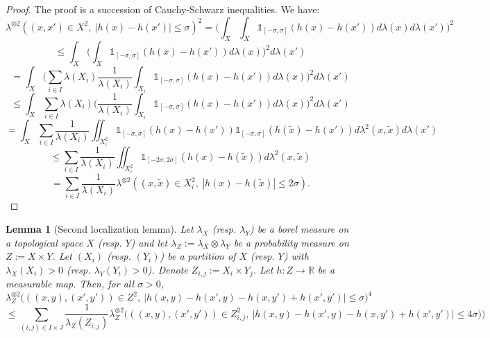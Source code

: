 \documentclass[a4paper]{article}
\newtheorem{lemma}[theorem]{Lemma}
\theoremstyle{definition}
\begin{document}
\begin{proof} The proof is a succession of Cauchy-Schwarz inequalities. We have:
$$\lambda^{\otimes 2}( (x,x') \in X^2, \ |h(x)-h(x')| \leq \sigma)^2 = \Big(\int_X \int_X \mathbb{1}_{[-\sigma,\sigma]}(h(x)-h(x')) d\lambda(x) d\lambda(x')\Big)^2 $$
$$ \leq \int_X \Big(\int_X \mathbb{1}_{[-\sigma,\sigma]}(h(x)-h(x')) d\lambda(x) \Big)^2 d\lambda(x') $$
$$ = \int_X \Big( \sum_{i \in I} \lambda(X_i) \frac{1}{\lambda(X_i)} \int_{X_i} \mathbb{1}_{[-\sigma,\sigma]}(h(x)-h(x')) d\lambda(x) \Big)^2 d\lambda(x')  $$
$$ \leq \int_X \sum_{i \in I} \lambda(X_i) \Big( \frac{1}{\lambda(X_i)} \int_{X_i} \mathbb{1}_{[-\sigma,\sigma]}(h(x)-h(x')) d\lambda(x) \Big)^2 d\lambda(x')  $$
$$ = \int_X \sum_{i \in I} \frac{1}{\lambda(X_i)} \iint_{X_i^2} \mathbb{1}_{[-\sigma,\sigma]}(h(x)-h(x')) \mathbb{1}_{[-\sigma,\sigma]}(h(\tilde{x})-h(x')) d\lambda^2(x,\tilde{x})  d\lambda(x') $$
$$ \leq  \sum_{i \in I} \frac{1}{\lambda(X_i)} \iint_{X_i^2} \mathbb{1}_{[-2 \sigma, 2 \sigma]}(h(x)-h(\tilde{x})) d\lambda^2(x,\tilde{x})  $$
$$ = \sum_{i \in I} \frac{1}{\lambda(X_i)} \lambda^{\otimes 2}( (x,\tilde{x}) \in X_i^2, \ |h(x)-h(\tilde{x})| \leq 2 \sigma). $$
\end{proof}

\begin{lemma}[Second localization lemma]\label{lem:2loc}
Let $\lambda_X$ (resp. $\lambda_Y$) be a borel measure on a topological space $X$ (resp. $Y$) and let $\lambda_Z := \lambda_X \otimes \lambda_Y$ be a probability measure on $Z := X \times Y$. Let $(X_i)$ (resp. $(Y_i)$) be a partition of $X$ (resp. $Y$) with $\lambda_X(X_i) > 0$ (resp. $\lambda_Y(Y_i)>0$). Denote $Z_{i,j} := X_i \times Y_j$. Let $h:Z \rightarrow \mathbb{R}$ be a measurable map. Then, for all $\sigma>0$, $$\lambda_Z^{\otimes 2}\Big( ((x,y),(x',y')) \in Z^2, \ |h(x,y)-h(x',y) - h(x,y') + h(x',y') | \leq \sigma \Big)^4 $$
$$ \leq \sum_{(i,j) \in I \times J} \frac{1}{\lambda_Z(Z_{i,j})} \lambda_Z^{\otimes 2}\Big( ((x,y),(x',y')) \in Z_{i,j}^2, \ | h(x,y) - h(x',y) - h(x,y') + h(x',y') | \leq 4\sigma ) \Big) $$
\end{lemma}
\end{document}
